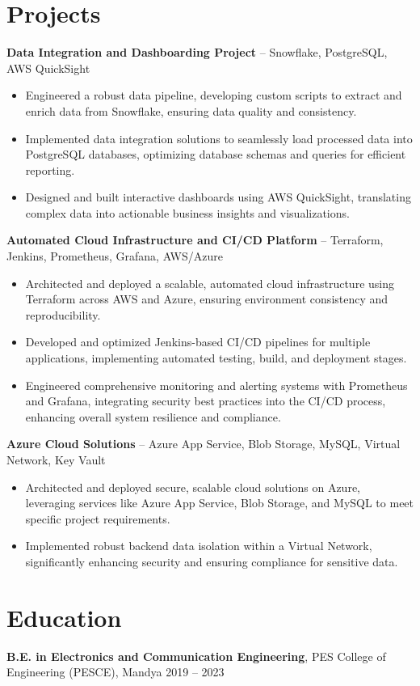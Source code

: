 \documentclass[a4paper,9pt]{article}
\begin{document}
\section*{Projects}
	\textbf{Data Integration and Dashboarding Project} – Snowflake, PostgreSQL, AWS QuickSight
\begin{itemize}[leftmargin=0.25in, label=\textbullet]
    \item Engineered a robust data pipeline, developing custom scripts to extract and enrich data from Snowflake, ensuring data quality and consistency.
    \item Implemented data integration solutions to seamlessly load processed data into PostgreSQL databases, optimizing database schemas and queries for efficient reporting.
    \item Designed and built interactive dashboards using AWS QuickSight, translating complex data into actionable business insights and visualizations.
\end{itemize}


	\textbf{Automated Cloud Infrastructure and CI/CD Platform} – Terraform, Jenkins, Prometheus, Grafana, AWS/Azure
\begin{itemize}[leftmargin=0.25in, label=\textbullet]
    \item Architected and deployed a scalable, automated cloud infrastructure using Terraform across AWS and Azure, ensuring environment consistency and reproducibility.
    \item Developed and optimized Jenkins-based CI/CD pipelines for multiple applications, implementing automated testing, build, and deployment stages.
    \item Engineered comprehensive monitoring and alerting systems with Prometheus and Grafana, integrating security best practices into the CI/CD process, enhancing overall system resilience and compliance.
\end{itemize}


\textbf{Azure Cloud Solutions} – Azure App Service, Blob Storage, MySQL, Virtual Network, Key Vault
\begin{itemize}[leftmargin=0.25in, label=\textbullet]
    \item Architected and deployed secure, scalable cloud solutions on Azure, leveraging services like Azure App Service, Blob Storage, and MySQL to meet specific project requirements.
    \item Implemented robust backend data isolation within a Virtual Network, significantly enhancing security and ensuring compliance for sensitive data.
\end{itemize}

\section*{Education}
\textbf{B.E. in Electronics and Communication Engineering}, PES College of Engineering (PESCE), Mandya \hfill 2019 – 2023
\end{document}
